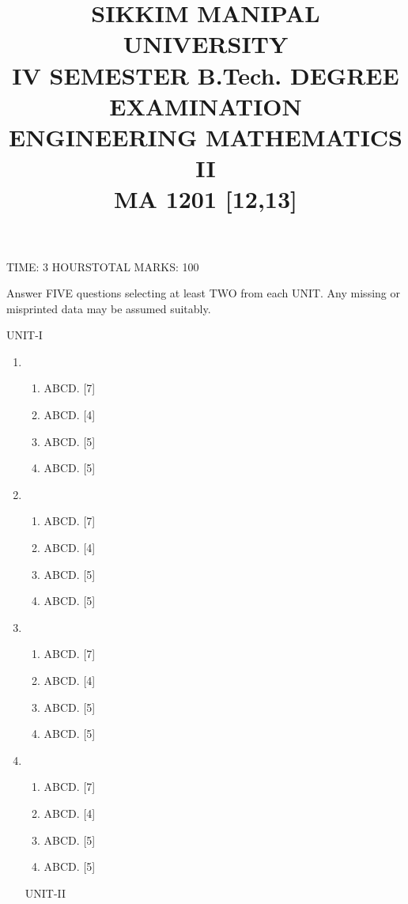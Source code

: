 \documentclass[a4paper,12pt]{article}
\title{\vspace{-2cm}\LARGE SIKKIM MANIPAL UNIVERSITY\\{\vspace{10pt}\small IV SEMESTER B.Tech. DEGREE EXAMINATION\vspace{.2cm}
\\ENGINEERING MATHEMATICS II\\\vspace{.2cm} MA 1201 [12,13]\\ \vspace{.1cm}}}
\author{}
\date{}
\begin{document}
\maketitle
\vspace{-65pt}
\begin{center}TIME: 3 HOURS{\hfill TOTAL MARKS: 100\\}
\end{center}
Answer FIVE questions selecting at least TWO from each UNIT. Any missing or misprinted data may be assumed suitably.
\begin{center}UNIT-I
\end{center}
\begin{enumerate}
\item \begin{enumerate}       
       \item ABCD. {\hfill [7]}
       \item ABCD. {\hfill [4]}
       \item ABCD. {\hfill [5]}
       \item ABCD. {\hfill [5]}
      \end{enumerate}
\item \begin{enumerate}       
       \item ABCD. {\hfill [7]}
       \item ABCD. {\hfill [4]}
       \item ABCD. {\hfill [5]}
       \item ABCD. {\hfill [5]}
      \end{enumerate}
\item \begin{enumerate}       
       \item ABCD. {\hfill [7]}
       \item ABCD. {\hfill [4]}
       \item ABCD. {\hfill [5]}
       \item ABCD. {\hfill [5]}
      \end{enumerate}
\item \begin{enumerate}       
       \item ABCD. {\hfill [7]}
       \item ABCD. {\hfill [4]}
       \item ABCD. {\hfill [5]}
       \item ABCD. {\hfill [5]}
      \end{enumerate}
\begin{center}
 UNIT-II
\end{center}


\end{enumerate}
\end{document}
